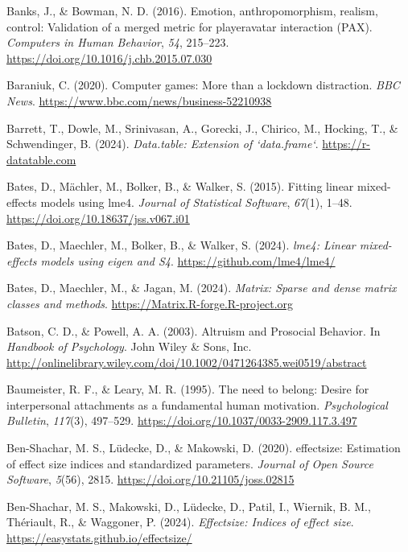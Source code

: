 \documentclass[
]{udthesis}
\newlength{\cslhangindent}
\newenvironment{CSLReferences}[2] %
 {\begin{list}{}{%
  \setlength{\itemindent}{0pt}
  \setlength{\leftmargin}{0pt}
  \setlength{\parsep}{0pt}
  \ifodd #1
   \setlength{\leftmargin}{\cslhangindent}
   \setlength{\itemindent}{-1\cslhangindent}
  \fi
  \setlength{\itemsep}{#2\baselineskip}}}
 {\end{list}}
\begin{document}
\begin{CSLReferences}{1}{0}
Banks, J., \& Bowman, N. D. (2016). Emotion, anthropomorphism, realism, control: Validation of a merged metric for player{\textendash}avatar interaction (PAX). \emph{Computers in Human Behavior}, \emph{54}, 215--223. \url{https://doi.org/10.1016/j.chb.2015.07.030}

Baraniuk, C. (2020). Computer games: More than a lockdown distraction. \emph{BBC News}. \url{https://www.bbc.com/news/business-52210938}

Barrett, T., Dowle, M., Srinivasan, A., Gorecki, J., Chirico, M., Hocking, T., \& Schwendinger, B. (2024). \emph{Data.table: Extension of `data.frame`}. \url{https://r-datatable.com}

Bates, D., Mächler, M., Bolker, B., \& Walker, S. (2015). Fitting linear mixed-effects models using {lme4}. \emph{Journal of Statistical Software}, \emph{67}(1), 1--48. \url{https://doi.org/10.18637/jss.v067.i01}

Bates, D., Maechler, M., Bolker, B., \& Walker, S. (2024). \emph{lme4: Linear mixed-effects models using eigen and S4}. \url{https://github.com/lme4/lme4/}

Bates, D., Maechler, M., \& Jagan, M. (2024). \emph{Matrix: Sparse and dense matrix classes and methods}. \url{https://Matrix.R-forge.R-project.org}

Batson, C. D., \& Powell, A. A. (2003). Altruism and {Prosocial Behavior}. In \emph{Handbook of {Psychology}}. {John Wiley \& Sons, Inc.} \url{http://onlinelibrary.wiley.com/doi/10.1002/0471264385.wei0519/abstract}

Baumeister, R. F., \& Leary, M. R. (1995). The need to belong: {Desire} for interpersonal attachments as a fundamental human motivation. \emph{Psychological Bulletin}, \emph{117}(3), 497--529. \url{https://doi.org/10.1037/0033-2909.117.3.497}

Ben-Shachar, M. S., Lüdecke, D., \& Makowski, D. (2020). {e}ffectsize: Estimation of effect size indices and standardized parameters. \emph{Journal of Open Source Software}, \emph{5}(56), 2815. \url{https://doi.org/10.21105/joss.02815}

Ben-Shachar, M. S., Makowski, D., Lüdecke, D., Patil, I., Wiernik, B. M., Thériault, R., \& Waggoner, P. (2024). \emph{Effectsize: Indices of effect size}. \url{https://easystats.github.io/effectsize/}


\end{CSLReferences}
\end{document}
